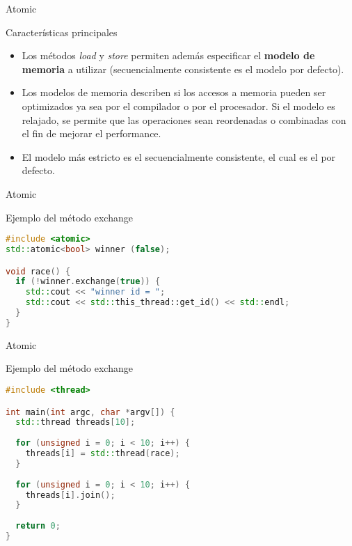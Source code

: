 \begin{frame}{Atomic}
\begin{block}{Características principales}
\begin{itemize}
  \item Los métodos \textit{load} y \textit{store} permiten además especificar el \textbf{modelo de memoria} a utilizar (secuencialmente consistente es el modelo por defecto).
  \item Los modelos de memoria describen si los accesos a memoria pueden ser optimizados ya sea por el compilador o por el procesador. Si el modelo es relajado, se permite que las operaciones sean reordenadas o combinadas con el fin de mejorar el performance.
  \item El modelo más estricto es el secuencialmente consistente, el cual es el por defecto.
\end{itemize}
\end{block}
\end{frame}

\begin{frame}[fragile]{Atomic}
\begin{block}{Ejemplo del método exchange}
\begin{lstlisting}[language=C++, basicstyle=\small]
#include <atomic>
std::atomic<bool> winner (false);

void race() {
  if (!winner.exchange(true)) {
    std::cout << "winner id = ";
    std::cout << std::this_thread::get_id() << std::endl;
  }
}
\end{lstlisting}
\end{block}
\end{frame}

\begin{frame}[fragile]{Atomic}
\begin{block}{Ejemplo del método exchange}
\begin{lstlisting}[language=C++, basicstyle=\small]
#include <thread>

int main(int argc, char *argv[]) {
  std::thread threads[10];
  
  for (unsigned i = 0; i < 10; i++) {
    threads[i] = std::thread(race);
  }
  
  for (unsigned i = 0; i < 10; i++) {
    threads[i].join();
  }
  
  return 0;
}
\end{lstlisting}
\end{block}
\end{frame}